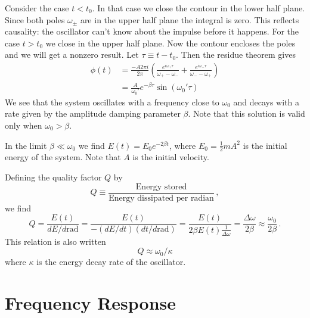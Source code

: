 \documentclass{article}
\begin{document}
Consider the case $t < t_0$.
In that case we close the contour in the lower half plane.
Since both poles $\omega_\pm$ are in the upper half plane the integral is zero.
This reflects causality: the oscillator can't know about the impulse before it happens.
For the case $t > t_{0}$ we close in the upper half plane.
Now the contour encloses the poles and we will get a nonzero result.
Let $\tau \equiv t - t_0$.
Then the residue theorem gives
\begin{align}
\phi(t) &=
\frac{-A 2\pi i}{2 \pi}
\left(
\frac{e^{i \omega_+ \tau}}{\omega_+ - \omega_-} +
\frac{e^{i \omega_- \tau}}{\omega_- - \omega_+}
\right) \\
&= \frac{A}{\omega_0'} e^{- \beta \tau} \sin(\omega_0' \tau)
\end{align}
We see that the system oscillates with a frequency close to $\omega_0$ and decays with a rate given by the amplitude damping parameter $\beta$.
Note that this solution is valid only when $\omega_0 > \beta$.

In the limit $\beta \ll \omega_0$ we find $E(t) = E_{0}e^{-2 \beta t}$, where $E_0=\frac{1}{2} m A^{2}$ is the initial energy of the system.
Note that $A$ is the initial velocity.

Defining the quality factor $Q$ by
\begin{equation}
Q \equiv \frac{\textrm{Energy stored}}{\textrm{Energy dissipated per radian}} \, ,
\end{equation}
we find
\begin{equation}
Q
= \frac{E(t)}{dE/d\textrm{rad}}
= \frac{E(t)}{-(dE/dt)(dt/d\textrm{rad})}
= \frac{E(t)}{2\beta E(t)\frac{1}{\Delta\omega}}
= \frac{\Delta\omega}{2\beta}\approx\frac{\omega_{0}}{2\beta} \, .
\end{equation}
This relation is also written
\begin{equation}
Q \approx \omega_0 / \kappa
\end{equation}
where $\kappa$ is the energy decay rate of the oscillator.


\section{Frequency Response}
\end{document}
